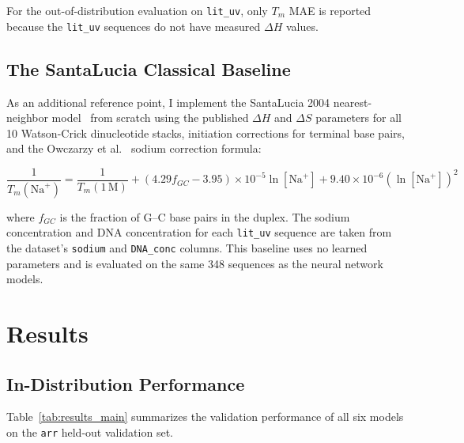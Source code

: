 \documentclass[12pt,oneside,letterpaper]{report}
\begin{document}
For the out-of-distribution evaluation on \texttt{lit\_uv}, only $T_m$ MAE is reported because the \texttt{lit\_uv} sequences do not have measured $\Delta H$ values.

\section{The SantaLucia Classical Baseline}

As an additional reference point, I implement the SantaLucia 2004 nearest-neighbor model~\cite{santalucia2004} from scratch using the published $\Delta H$ and $\Delta S$ parameters for all 10 Watson-Crick dinucleotide stacks, initiation corrections for terminal base pairs, and the Owczarzy et al.~\cite{owczarzy2004} sodium correction formula:

\begin{equation}
    \frac{1}{T_m(\text{Na}^+)} = \frac{1}{T_m(1\,\text{M})} + (4.29 f_{GC} - 3.95) \times 10^{-5} \ln[\text{Na}^+] + 9.40 \times 10^{-6} (\ln[\text{Na}^+])^2
    \label{eq:owczarzy}
\end{equation}

where $f_{GC}$ is the fraction of G--C base pairs in the duplex. The sodium concentration and DNA concentration for each \texttt{lit\_uv} sequence are taken from the dataset's \texttt{sodium} and \texttt{DNA\_conc} columns. This baseline uses no learned parameters and is evaluated on the same 348 sequences as the neural network models.

\chapter{Results}

\section{In-Distribution Performance}

Table~\ref{tab:results_main} summarizes the validation performance of all six models on the \texttt{arr} held-out validation set.
\end{document}
